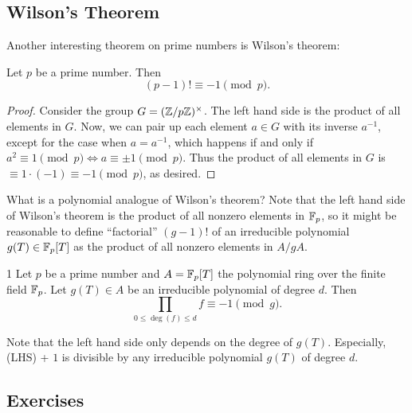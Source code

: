 \subsection{Wilson's Theorem}
\label{subsec:basicnt_wilson}

Another interesting theorem on prime numbers is Wilson's theorem:
\begin{theorem}
    Let $p$ be a prime number. Then
    \[
        (p - 1)! \equiv -1 \pmod{p}.
    \]
\end{theorem}
\begin{proof}
    Consider the group $G = (\mathbb{Z} / p\mathbb{Z})^\times$.
    The left hand side is the product of all elements in $G$.
    Now, we can pair up each element $a \in G$ with its inverse $a^{-1}$, except for the case when $a = a^{-1}$, which happens if and only if $a^2 \equiv 1 \pmod{p} \Leftrightarrow a \equiv \pm 1 \pmod{p}$.
    Thus the product of all elements in $G$ is $\equiv 1 \cdot (-1) \equiv -1 \pmod{p}$, as desired.
\end{proof}

What is a polynomial analogue of Wilson's theorem?
Note that the left hand side of Wilson's theorem is the product of all nonzero elements in $\mathbb{F}_p$, so it might be reasonable to define ``factorial'' $(g - 1)!$ of an irreducible polynomial $g(T) \in \mathbb{F}_p[T]$ as the product of all nonzero elements in $A / gA$.

\begin{theorem}
    \label{thm:polynomial_wilson}1
    Let $p$ be a prime number and $A = \mathbb{F}_p[T]$ the polynomial ring over the finite field $\mathbb{F}_p$.
    Let $g(T) \in A$ be an irreducible polynomial of degree $d$.
    Then
    \[
        \prod_{0 \le \deg(f) \le d} f \equiv -1 \pmod{g}.
    \]
\end{theorem}

Note that the left hand side only depends on the degree of $g(T)$.
Especially, (LHS) + $1$ is divisible by any irreducible polynomial $g(T)$ of degree $d$.

\subsection*{Exercises}


